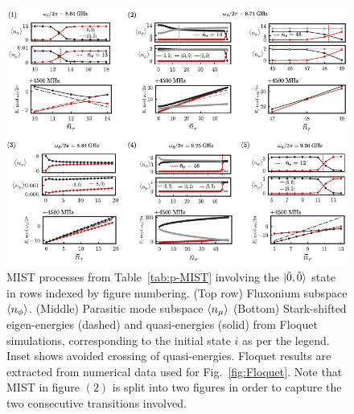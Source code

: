 \documentclass[%
reprint,
superscriptaddress,
 amsmath,amssymb,
 aps,
 prx,
longbibliography,
floatfix,
]{revtex4-2}
\newcommand{\sh}[1]{{\color{blue}{{}[SS: #1]}}}%
\begin{document}
\begin{figure}
    \centering
    \includegraphics[width=1.0\textwidth]{Supp_Fig/Trans0.pdf}
    \caption{MIST processes from Table~\ref{tab:p-MIST} involving the $\ket{\tilde{0},\tilde{0}}$ state in rows indexed by figure numbering. (Top row) Fluxonium subspace $\braket{n_\phi}$. (Middle) Parasitic mode subspace $\braket{n_\mu}$ (Bottom) Stark-shifted eigen-energies (dashed) and quasi-energies (solid) from Floquet simulations, corresponding to the initial state $i$ as per the legend. Inset shows avoided crossing of quasi-energies. Floquet results are extracted from numerical data used for Fig.~\ref{fig:Floquet}. Note that MIST in figure $(2)$ is split into two figures in order to capture the two consecutive transitions involved.}
    \label{fig:Trans0}
\end{figure}
\end{document}
